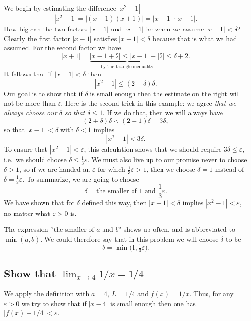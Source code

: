 We begin by estimating the difference $|x^2-1|$
\[
|x^2-1| = |(x-1)(x+1)| = |x-1|\cdot|x+1|.
\]
How big can the two factors $|x-1|$ and $|x+1|$ be when we assume
$|x-1|<\delta$?  Clearly the first factor $|x-1|$ satisfies $|x-1|<\delta$
because that is what we had assumed.
%
For the second factor we have
\[
|x+1| = \underbrace{|x-1 +2| \leq |x-1| + |2|}_{\text{by the triangle inequality}}
\leq \delta + 2.
\]
It follows that if $|x-1|<\delta$ then
\[
|x^2-1| \leq (2+\delta)\delta.
\]
Our goal is to show that if $\delta$ is small enough then the estimate on the
right will not be more than $\varepsilon$.  Here is the second trick in this
example: we agree \textit{that we always choose our $\delta$ so that $\delta\leq
1$.}  If we do that, then we will always have
\[
(2+\delta)\delta < (2+1)\delta =3\delta,
\]
so that $|x-1|<\delta$ with $\delta<1$ implies
\[
|x^2-1| < 3\delta.
\]
To ensure that $|x^2-1|<\varepsilon$, this calculation shows that we should
require $3\delta\leq \varepsilon$, i.e.\ we should choose $\delta \leq
\frac13\varepsilon$.  We must also live up to our promise never to choose
$\delta>1$, so if we are handed an $\varepsilon$ for which
$\frac13\varepsilon>1$, then we choose $\delta=1$ instead of $\delta =
\frac13\varepsilon$.  To summarize, we are going to choose
\[
\delta = \text{the smaller of }1\text{ and }\frac13\varepsilon.
\]
We have shown that for $\delta$ defined this way, then $|x-1|<\delta$
implies $|x^2-1|<\varepsilon$, no matter what $\varepsilon>0$ is.

The expression ``the smaller of $a$ and $b$'' shows up often, and is
abbreviated to $\min(a, b)$.  We could therefore say that in this problem
we will choose $\delta$ to be
\[
\delta = \min \bigl(1, \tfrac13 \varepsilon\bigr).
\]


\subsection{Show that $\lim_{x\to 4}1/x = 1/4$} 

We apply the definition with $a=4$, $L=1/4$ and $f(x) = 1/x$.
Thus, for any $\varepsilon>0$ we try to show that if $|x-4|$ is small
enough then one has $|f(x)-1/4|<\varepsilon$.

